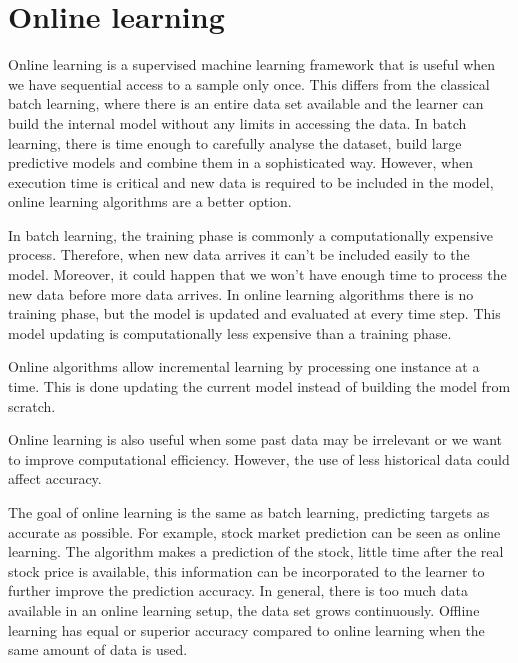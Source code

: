 \newpage
\section{Online learning} \label{sec:onoffline}

Online learning is a supervised machine learning framework that is useful when
we have sequential access to a sample only once.  This differs from the
classical batch learning, where there is an entire data set available and the
learner can build the internal model without any limits in accessing the data.
In batch learning, there is time enough to carefully analyse the dataset, build
large predictive models and combine them in a sophisticated way. However, when
execution time is critical and new data is required to be included in the model,
online learning algorithms are a better option.

In batch learning, the training phase is commonly a computationally expensive
process. Therefore, when new data arrives it can't be included easily to the
model. Moreover, it could happen that we won't have enough time to process the
new data before more data arrives. In online learning algorithms there is no
training phase, but the model is updated and evaluated at every time step. This
model updating is computationally less expensive than a training phase.



Online algorithms allow incremental learning by processing one instance at a
time. This is done updating the current model instead of building the model from
scratch.

Online learning is also useful when some past data may be irrelevant
or we want to improve computational efficiency. However, the use of less
historical data could affect accuracy.

The goal of online learning is the same as batch learning, predicting targets as
accurate as possible. For example, stock market prediction can be seen as online
learning. The algorithm makes a prediction of the stock, little time after the
real stock price is available, this information can be incorporated to the
learner to further improve the prediction accuracy. In general, there is too
much data available in an online learning setup, the data set grows
continuously. Offline learning has equal or superior accuracy compared to online
learning when the same amount of data is used.

